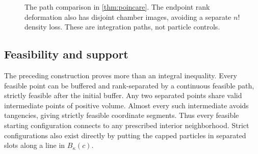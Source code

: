 \documentclass[11pt]{article}
\numberwithin{equation}{section}
\theoremstyle{definition}
\theoremstyle{remark}\newtheorem{remark}[theorem]{Remark}
\newcommand{\R}{\mathbb R}
\begin{document}
\begin{figure}[htbp]\centering



\caption{The path comparison in \cref{thm:poincare}. The endpoint rank
deformation also has disjoint chamber images, avoiding a separate $n!$
density loss. These are integration paths, not particle controls.}
\label{fig:coordinates}
\end{figure}

\subsection{Feasibility and support}

The preceding construction proves more than an integral inequality. Every
feasible point can be buffered and rank-separated by a continuous feasible
path, strictly feasible after the initial buffer. Any two separated points
share valid intermediate points of positive volume. Almost every such
intermediate avoids tangencies, giving strictly feasible coordinate segments.
Thus every feasible starting configuration connects to any prescribed
interior neighborhood. Strict configurations also exist directly by putting
the capped particles in separated slots along a line in $B_\kappa(c)$.
\end{document}
